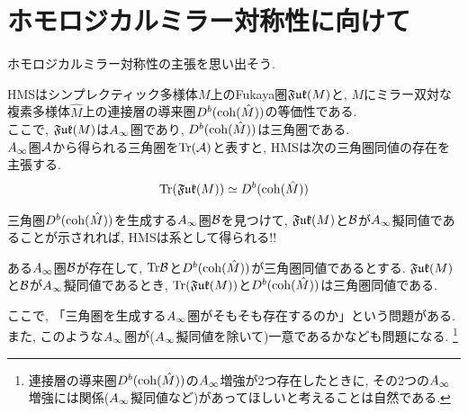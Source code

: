 \documentclass[aspectratio=169, dvipdfmx, 8pt, notheorems, uplatex]{beamer}
\begin{document}


\section{ホモロジカルミラー対称性に向けて}

\begin{frame}
  ホモロジカルミラー対称性の主張を思い出そう. 

  \begin{conjecture}[ホモロジカルミラー対称性]
    HMSはシンプレクティック多様体$M$上のFukaya圏$\mathfrak{Fuk}(M)$と, $M$にミラー双対な複素多様体$\hat{M}$上の連接層の導来圏$D^b(\mathrm{coh}(\hat{M}))$の等価性である. \\
    ここで, $\mathfrak{Fuk}(M)$は$A_\infty$圏であり, $D^b(\mathrm{coh}(\hat{M}))$は三角圏である. \\
    $A_\infty$圏$\mathcal{A}$から得られる三角圏を$\mathrm{Tr}(\mathcal{A})$と表すと, HMSは次の三角圏同値の存在を主張する. 
    \begin{align*}
      \mathrm{Tr}(\mathfrak{Fuk}(M)) \simeq D^b(\mathrm{coh}(\hat{M}))
    \end{align*}
  \end{conjecture} 

  三角圏$D^b(\mathrm{coh}(\hat{M}))$を生成する$A_\infty$圏$\mathcal{B}$を見つけて, $\mathfrak{Fuk}(M)$と$\mathcal{B}$が$A_\infty$擬同値であることが示されれば, HMSは系として得られる!!

  \begin{conjecture}[増強としてのホモロジカルミラー対称性]
    ある$A_\infty$圏$\mathcal{B}$が存在して, $\mathrm{Tr}\mathcal{B}$と$D^b(\mathrm{coh}(\hat{M}))$が三角圏同値であるとする.
    $\mathfrak{Fuk}(M)$と$\mathcal{B}$が$A_\infty$擬同値であるとき, $\mathrm{Tr}(\mathfrak{Fuk}(M))$と$D^b(\mathrm{coh}(\hat{M}))$は三角圏同値である. 
  \end{conjecture}

  ここで, 「三角圏を生成する$A_\infty$圏がそもそも存在するのか」という問題がある. 
  また, このような$A_\infty$圏が($A_\infty$擬同値を除いて)一意であるかなども問題になる.
  \footnote{
    連接層の導来圏$D^b(\mathrm{coh}(\hat{M}))$の$A_\infty$増強が2つ存在したときに, その2つの$A_\infty$増強には関係($A_\infty$擬同値など)があってほしいと考えることは自然である. 
  }
\end{frame}
\end{document}
